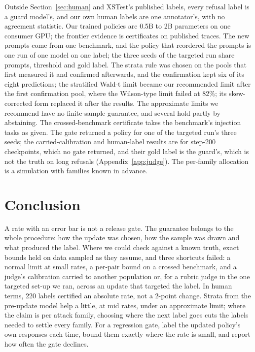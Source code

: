 \documentclass[letterpaper]{article} %
\newcommand{\SWT}{stratified Wald-t limit}
\begin{document}
Outside Section~\ref{sec:human} and XSTest's published labels, every refusal label is a guard model's, and our own human
labels are one annotator's, with no agreement statistic. Our trained policies are 0.5B to 2B parameters on one consumer GPU;
the frontier evidence is certificates on published traces. The new prompts come from one benchmark, and the policy that
reordered the prompts is one run of one model on one label; the three seeds of the targeted run share prompts, threshold
and gold label. The strata rule was chosen on the pools that first measured it and confirmed afterwards, and the
confirmation kept six of its eight predictions; the \SWT{} became our recommended limit after the first confirmation pool,
where the Wilson-type limit failed at 82\%; its skew-corrected form replaced it after the results. The approximate limits we recommend have no finite-sample guarantee, and
several hold partly by abstaining. The crossed-benchmark certificate takes the benchmark's injection tasks as given. The gate returned a policy for one of the targeted run's three seeds; the carried-calibration and human-label results are for step-200 checkpoints, which no gate returned, and their gold label is the guard's, which is not the truth on long refusals (Appendix~\ref{app:judge}).
The per-family allocation is a simulation with families known in advance.

\section{Conclusion}

A rate with an error bar is not a release gate. The guarantee belongs to the whole procedure: how the update was chosen,
how the sample was drawn and what produced the label. Where we could check against a known truth, exact bounds held on
data sampled as they assume, and three shortcuts failed: a normal limit at small rates, a per-pair bound on a crossed
benchmark, and a judge's calibration carried to another population or, for a rubric judge in the one targeted set-up we ran, across an update that targeted the label.
In human terms, 220 labels certified an absolute rate, not a 2-point change.
Strata from the pre-update model help a little, at mid rates, under an approximate limit; where the claim is per attack
family, choosing where the next label goes cuts the labels needed to settle every family. For a regression gate, label the updated policy's own responses each time, bound them exactly where
the rate is small, and report how often the gate declines.



\appendix

\end{document}
